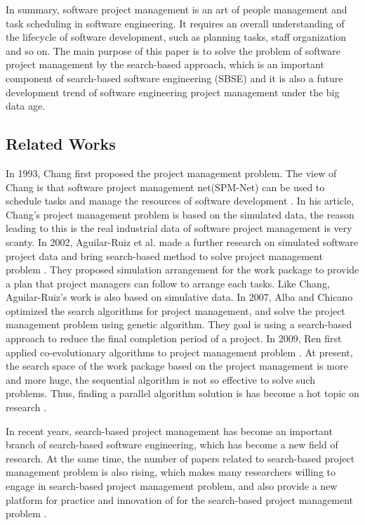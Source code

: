 In summary, software project management is an art of people management and task
scheduling in software engineering. It requires an overall understanding of the
lifecycle of software development, such as planning tasks, staff organization
and so on. The main purpose of this paper is to solve the problem of software
project management by the search-based approach, which is an important component
of search-based software engineering (SBSE) and it is also a future development
trend of software engineering project management under the big data age.


\subsection{Related Works}
%
In 1993, Chang first proposed the project management problem. The view of Chang
is that software project management net(SPM-Net) can be used to schedule tasks
 and manage the resources of software development \cite{chang}. In his article,
Chang's project management problem is based on the simulated data, the reason
leading to this is the real industrial data of software project management is
very scanty. In 2002, Aguilar-Ruiz et al. made a further research on simulated
software project data and bring search-based method to solve project management
problem \cite{alba}. They proposed simulation arrangement for the work package
to provide a plan that project managers can follow to arrange each tasks. Like
Chang, Aguilar-Ruiz's work is also based on simulative data. In 2007, Alba and
Chicano optimized the search algorithms for project management, and solve the
project management problem using genetic algorithm. They goal is using a
search-based approach to reduce the final completion period of a project. In
2009, Ren first applied co-evolutionary algorithms to project management problem
\cite{ren}. At present, the search space of the work package based on the
project management is more and more huge, the sequential algorithm is not so
effective to solve such problems. Thus, finding a parallel algorithm solution is
has become a hot topic on research \cite{pentico}.


In recent years, search-based project management has become an important branch
of search-based software engineering, which has become a new field of
research. At the same time, the number of papers related to search-based project
management problem is also rising, which makes many researchers willing to
engage in search-based project management problem, and also provide a new
platform for practice and innovation of for the search-based project management
problem \cite{penta}.



